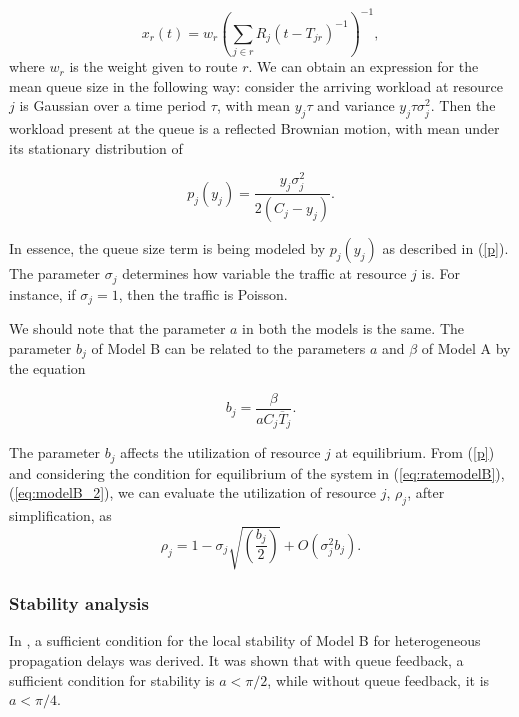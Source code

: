 \documentclass[conference]{IEEEtran}
\begin{document}
\begin{equation}
x_{r}\left(t\right) = w_{r}\left(\sum_{j\in r}R_{j}\left(t - T_{jr}\right)^{-1}\right)^{-1},
\end{equation}
where $w_{r}$ is the weight given to route $r$.
We can obtain an expression for the mean queue size in the following way: consider the 
arriving workload at resource $j$ is Gaussian over a time period $\tau$, with mean 
$y_{j}\tau$ and variance $y_{j}\tau\sigma_{j}^{2}$. Then the workload present at the queue 
is a reflected Brownian motion, with mean under its stationary distribution of

\begin{equation}
\label{p}
p_{j}\left(y_{j}\right) = \frac{y_{j}\sigma_{j}^{2}}{2\left(C_{j} - y_{j}\right)}.
\end{equation}

In essence, 
the queue size term is being modeled by $p_{j}\left(y_{j}\right)$ as described 
in (\ref{p}). The parameter $\sigma_{j}$ determines how variable the 
traffic at resource $j$ is. For instance, if $\sigma_{j} = 1$, then the traffic is Poisson. 

We should note that the parameter $a$ in both the models is the same. The parameter $b_{j}$ of 
Model B can be related to the parameters $a$ and $\beta$ of Model A by the equation

\begin{equation}
\label{eq:b}
b_{j} = \frac{\beta}{aC_{j}\overline{T}_{j}}.
\end{equation}

The parameter $b_{j}$ affects the utilization of resource $j$ at equilibrium. From (\ref{p}) 
and considering the condition for equilibrium of the system in (\ref{eq:ratemodelB}), (\ref{eq:modelB_2}), we can evaluate the utilization of resource $j$, $\rho_{j}$, after simplification, as
\begin{equation}
\label{eq:util}
\rho_{j} = 1 - \sigma_{j}\sqrt{\left(\frac{b_{j}}{2}\right)} + O\left(\sigma_{j}^{2}b_{j}\right).
\end{equation}

\subsubsection{Stability analysis}
In \cite{krv}, a sufficient condition for the local stability of Model B for heterogeneous 
propagation delays was derived. It was shown that with queue feedback, a sufficient condition for stability is $a < \pi/2$, while without queue feedback, it is $a < \pi/4$.
\end{document}
